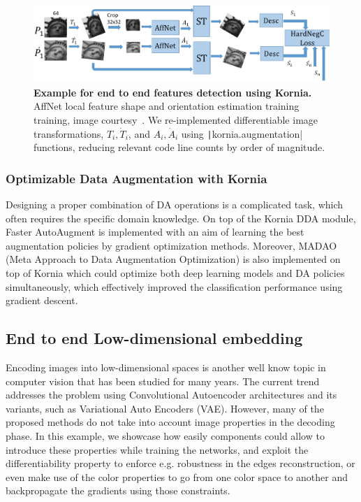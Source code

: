 \begin{figure}[htb]%
\centering
\includegraphics[width=0.95\linewidth]{main/chapter03/data/dda/imgs/affnet_tr_scheme2.PNG}
\caption[Example for end to end features detection using Kornia]{\textbf{Example for end to end features detection using Kornia.} AffNet local feature shape and orientation estimation training training, image courtesy~\cite{AffNet2018}. We re-implemented differentiable image transformations, $T_i, \dot{T}_i$, and $A_i, \dot{A}_i$ using \texttt|kornia.augmentation| functions, reducing relevant code line counts by order of magnitude.}
\label{fig:affnet-training-scheme}
\end{figure}

\subsubsection{Optimizable Data Augmentation with Kornia}

Designing a proper combination of DA operations is a complicated task, which often requires the specific domain knowledge. On top of the Kornia DDA module, Faster AutoAugment \cite{hataya2019faster} is implemented with an aim of learning the best augmentation policies by gradient optimization methods. Moreover, MADAO \cite{hataya2019faster} (Meta Approach to Data Augmentation Optimization) is also implemented on top of Kornia which could optimize both deep learning models and DA policies simultaneously, which effectively improved the classification performance using gradient descent.


\subsection{End to end Low-dimensional embedding}
\label{section:use_cases:image_reconstruction}

Encoding images into low-dimensional spaces is another well know topic in computer vision that has been studied for many years. The current trend  addresses the problem using  Convolutional Autoencoder architectures and  its   variants, such as Variational Auto Encoders (VAE). However, many of the proposed methods do not take into account image properties in the decoding phase. In this example, we  showcase how easily \lib{} components could allow to introduce these properties while training the networks, and exploit the differentiability property to enforce e.g. robustness in the edges reconstruction, or even make use of the color properties to go from one color space to another and backpropagate the gradients using those constraints.

